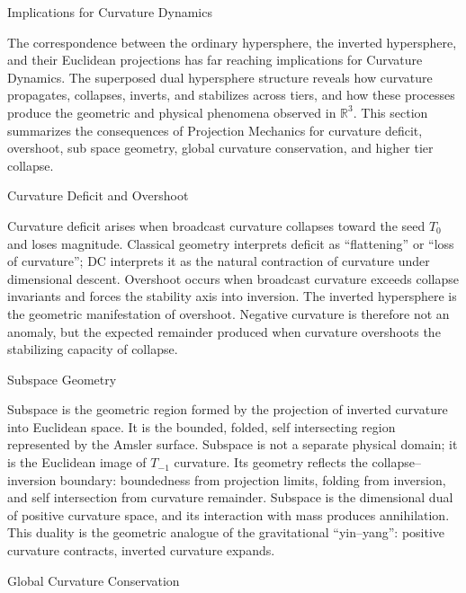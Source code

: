 \documentclass[final,onefignum,onetabnum]{siamart}
\begin{document}
\begin{section}{Implications for Curvature Dynamics}

The correspondence between the ordinary hypersphere, the inverted hypersphere, and their Euclidean projections has far reaching implications for Curvature Dynamics. The superposed dual hypersphere structure reveals how curvature propagates, collapses, inverts, and stabilizes across tiers, and how these processes produce the geometric and physical phenomena observed in $\mathbb{R}^3.$ This section summarizes the consequences of Projection Mechanics for curvature deficit, overshoot, sub space geometry, global curvature conservation, and higher tier collapse.

\begin{subsection}{Curvature Deficit and Overshoot}

Curvature deficit arises when broadcast curvature collapses toward the seed $T_0$ and loses magnitude. Classical geometry interprets deficit as “flattening” or “loss of curvature”; DC interprets it as the natural contraction of curvature under dimensional descent. Overshoot occurs when broadcast curvature exceeds collapse invariants and forces the stability axis into inversion. The inverted hypersphere is the geometric manifestation of overshoot. Negative curvature is therefore not an anomaly, but the expected remainder produced when curvature overshoots the stabilizing capacity of collapse.
\end{subsection}

\begin{subsection}{Subspace Geometry}

Subspace is the geometric region formed by the projection of inverted curvature into Euclidean space. It is the bounded, folded, self intersecting region represented by the Amsler surface. Subspace is not a separate physical domain; it is the Euclidean image of $T_{-1}$ curvature. Its geometry reflects the collapse–inversion boundary: boundedness from projection limits, folding from inversion, and self intersection from curvature remainder. Subspace is the dimensional dual of positive curvature space, and its interaction with mass produces annihilation. This duality is the geometric analogue of the gravitational ``yin–yang'': positive curvature contracts, inverted curvature expands.
\end{subsection}

\begin{subsection}{Global Curvature Conservation}


\end{subsection}
\end{section}
\end{document}
